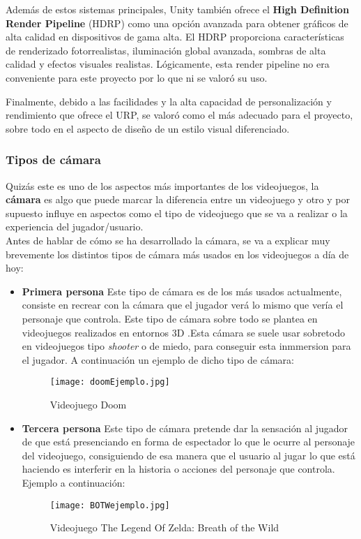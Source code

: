 Además de estos sistemas principales, Unity también ofrece el \textbf{High Definition Render Pipeline} (HDRP) como una opción avanzada para obtener gráficos de alta calidad en dispositivos de gama alta. El HDRP proporciona características de renderizado fotorrealistas, iluminación global avanzada, sombras de alta calidad y efectos visuales realistas. Lógicamente, esta render pipeline no era conveniente para este proyecto por lo que ni se valoró su uso.

Finalmente, debido a las facilidades y la alta capacidad de personalización y rendimiento que ofrece el URP, se valoró como el más adecuado para el proyecto, sobre todo en el aspecto de diseño de un estilo visual diferenciado.

\subsubsection{Tipos de cámara} 

Quizás este es uno de los aspectos más importantes de los videojuegos, la \textbf{cámara} es algo
que puede marcar la diferencia entre un videojuego y otro y por supuesto influye en aspectos como
el tipo de videojuego que se va a realizar o la experiencia del jugador/usuario.\\

Antes de hablar de cómo se ha desarrollado la cámara, se va a explicar muy brevemente los distintos tipos de cámara más usados en los videojuegos a día de hoy: 
\begin{itemize}
    \item \textbf{Primera persona} Este tipo de cámara es de los más usados actualmente, consiste en recrear con la cámara 
    que el jugador verá lo mismo que vería el personaje que controla. Este tipo de cámara sobre todo se plantea en videojuegos realizados en entornos 3D .Esta cámara se suele usar sobretodo en 
    videojuegos tipo \textit{shooter} o de miedo, para conseguir esta inmmersion para el jugador. A continuación un ejemplo de dicho tipo de cámara:
    \begin{figure}[H]
        \centering
        \texttt{[image: doomEjemplo.jpg]}
        \caption{Videojuego Doom}
    \end{figure}
    \item \textbf{Tercera persona} Este tipo de cámara pretende dar la sensación al jugador de que está presenciando
    en forma de espectador lo que le ocurre al personaje del videojuego, consiguiendo de esa manera que el usuario
    al jugar lo que está haciendo es interferir en la historia o acciones del personaje que controla. Ejemplo a continuación:
    \begin{figure}[H]
        \centering
        \texttt{[image: BOTWejemplo.jpg]}
        \caption{Videojuego The Legend Of Zelda: Breath of the Wild}
    \end{figure}
\end{itemize}

